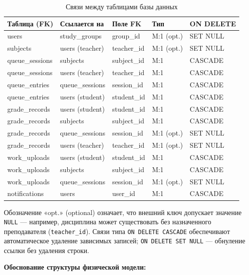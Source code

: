 \begin{table}[ht!]
\centering
\caption{Связи между таблицами базы данных}
\label{tab:db_relations}
\small
\begin{tabularx}{\textwidth}{p{3.2cm}|p{3.2cm}|p{2.5cm}|p{1.8cm}|p{3cm}}
\hline
\textbf{Таблица (FK)} & \textbf{Ссылается на} & \textbf{Поле FK} & \textbf{Тип} & \textbf{ON DELETE} \\
\hline
users & study\_groups & group\_id & M:1 (opt.) & SET NULL \\
\hline
subjects & users (teacher) & teacher\_id & M:1 (opt.) & SET NULL \\
\hline
queue\_sessions & subjects & subject\_id & M:1 & CASCADE \\
\hline
queue\_sessions & users (teacher) & teacher\_id & M:1 & CASCADE \\
\hline
queue\_entries & queue\_sessions & session\_id & M:1 & CASCADE \\
\hline
queue\_entries & users (student) & student\_id & M:1 & CASCADE \\
\hline
grade\_records & users (student) & student\_id & M:1 & CASCADE \\
\hline
grade\_records & subjects & subject\_id & M:1 & CASCADE \\
\hline
grade\_records & queue\_sessions & session\_id & M:1 (opt.) & SET NULL \\
\hline
grade\_records & users (teacher) & teacher\_id & M:1 (opt.) & SET NULL \\
\hline
work\_uploads & users (student) & student\_id & M:1 & CASCADE \\
\hline
work\_uploads & subjects & subject\_id & M:1 & CASCADE \\
\hline
work\_uploads & queue\_sessions & session\_id & M:1 (opt.) & SET NULL \\
\hline
notifications & users & user\_id & M:1 & CASCADE \\
\hline
\end{tabularx}
\end{table}

Обозначение «opt.» (optional) означает, что внешний ключ допускает значение \texttt{NULL} —
например, дисциплина может существовать без назначенного преподавателя (\texttt{teacher\_id}).
Связи типа \texttt{ON DELETE CASCADE} обеспечивают автоматическое удаление зависимых записей;
\texttt{ON DELETE SET NULL} — обнуление ссылки без удаления строки.

\textbf{Обоснование структуры физической модели:}

